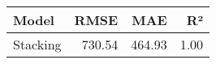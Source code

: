 \begin{tabular}{lrrr}
\toprule
Model & RMSE & MAE & R² \\
\midrule
Stacking & 730.54 & 464.93 & 1.00 \\
\bottomrule
\end{tabular}

